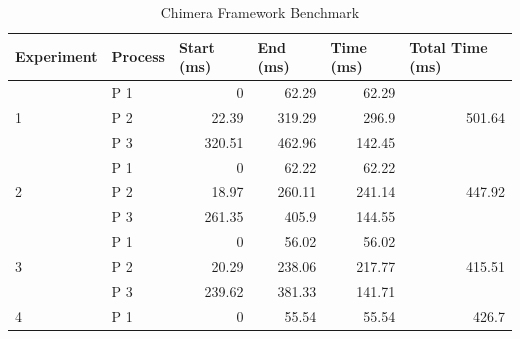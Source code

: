 \documentclass[conference]{IEEEtran}
\begin{document}
\begin{table}[]
\centering
\caption{Chimera Framework Benchmark}
    \label{tbl:benchmark}
\begin{tabular}{@{}llrrrr@{}}
\toprule
Experiment          & Process & \multicolumn{1}{l}{Start (ms)} & \multicolumn{1}{l}{End (ms)} & \multicolumn{1}{l}{Time (ms)} & \multicolumn{1}{l}{Total Time (ms)} \\ \midrule
\multirow{3}{*}{1}  & P 1     & 0                              & 62.29                        & 62.29                                   & \multirow{3}{*}{501.64}                       \\
                    & P 2     & 22.39                          & 319.29                       & 296.9                                   &                                               \\
                    & P 3     & 320.51                         & 462.96                       & 142.45                                  &                                               \\
\multirow{3}{*}{2}  & P 1     & 0                              & 62.22                        & 62.22                                   & \multirow{3}{*}{447.92}                       \\
                    & P 2     & 18.97                          & 260.11                       & 241.14                                  &                                               \\
                    & P 3     & 261.35                         & 405.9                        & 144.55                                  &                                               \\
\multirow{3}{*}{3}  & P 1     & 0                              & 56.02                        & 56.02                                   & \multirow{3}{*}{415.51}                       \\
                    & P 2     & 20.29                          & 238.06                       & 217.77                                  &                                               \\
                    & P 3     & 239.62                         & 381.33                       & 141.71                                  &                                               \\
\multirow{3}{*}{4}  & P 1     & 0                              & 55.54                        & 55.54                                   & \multirow{3}{*}{426.7}                        \\

\end{tabular}
\end{table}
\end{document}
